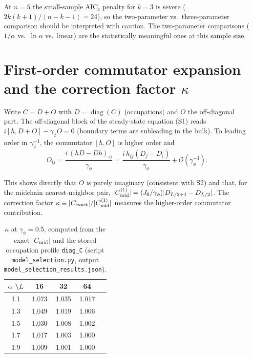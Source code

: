 \documentclass[aps,prb,twocolumn,superscriptaddress]{revtex4-2}
\begin{document}
At $n=5$ the small-sample $\text{AIC}_c$ penalty for $k=3$ is severe ($2k(k+1)/(n-k-1) = 24$), so the two-parameter vs.\ three-parameter comparison should be interpreted with caution. The two-parameter comparisons ($1/\alpha$ vs.\ $\ln\alpha$ vs.\ linear) are the statistically meaningful ones at this sample size.

\section{First-order commutator expansion and the correction factor $\kappa$}
\label{sec:S5}

Write $C = D + O$ with $D = \operatorname{diag}(C)$ (occupations) and $O$ the off-diagonal part. The off-diagonal block of the steady-state equation (S1) reads $i[h, D + O] - \gamma_\phi O = 0$ (boundary terms are subleading in the bulk). To leading order in $\gamma_\phi^{-1}$, the commutator $[h, O]$ is higher order and
\begin{equation}
O_{ij} = \frac{i\,(h D - D h)_{ij}}{\gamma_\phi} = \frac{i\,h_{ij}(D_j - D_i)}{\gamma_\phi} + \mathcal{O}(\gamma_\phi^{-3}).
\tag{S7}
\end{equation}

This shows directly that $O$ is purely imaginary (consistent with S2) and that, for the midchain nearest-neighbor pair, $|C_{\rm mid}^{(1)}| = (J_0/\gamma_\phi)|D_{L/2+1} - D_{L/2}|$. The correction factor $\kappa \equiv |C_{\rm exact}|/|C_{\rm mid}^{(1)}|$ measures the higher-order commutator contribution.

\begin{table}[h]
\caption{$\kappa$ at $\gamma_\phi = 0.5$, computed from the exact $|C_{\rm mid}|$ and the stored occupation profile \texttt{diag\_C} (script \texttt{model\_selection.py}, output \texttt{model\_selection\_results.json}).}
\label{tab:S3}
\begin{ruledtabular}
\begin{tabular}{ccccc}
$\alpha$ \textbackslash $L$ & 16 & 32 & 64 \\
\hline
1.1 & 1.073 & 1.035 & 1.017 \\
1.3 & 1.049 & 1.019 & 1.006 \\
1.5 & 1.030 & 1.008 & 1.002 \\
1.7 & 1.017 & 1.003 & 1.000 \\
1.9 & 1.009 & 1.001 & 1.000 \\
\end{tabular}
\end{ruledtabular}
\end{table}
\end{document}
